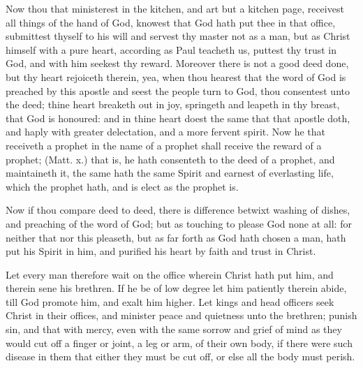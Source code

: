 Now thou that ministerest in the kitchen, and art but a 
kitchen page, receivest all things of the hand of God, 
knowest that God hath put thee in that office, submittest thyself
to his will and servest thy master not as a man, but as 
Christ himself with a pure heart, according as Paul 
teacheth us, puttest thy trust in God, and with him seekest 
thy reward. Moreover there is not a good deed done, but 
thy heart rejoiceth therein, yea, when thou hearest that the 
word of God is preached by this apostle and seest the 
people turn to God, thou consentest unto the deed; thine 
heart breaketh out in joy, springeth and leapeth in thy breast, 
that God is honoured: and in thine heart doest the same 
that that apostle doth, and haply with greater delectation, 
and a more fervent spirit. Now he that receiveth a prophet 
in the name of a prophet shall receive the reward of a 
prophet; (Matt. x.) that is, he hath consenteth to the deed 
of a prophet, and maintaineth it, the same hath the same 
Spirit and earnest of everlasting life, which the prophet 
hath, and is elect as the prophet is. 

Now if thou compare deed to deed, there is difference 
betwixt washing of dishes, and preaching of the word of 
God; but as touching to please God none at all: for 
neither that nor this pleaseth, but as far forth as God hath 
chosen a man, hath put his Spirit in him, and purified his 
heart by faith and trust in Christ. 

Let every man therefore wait on the office wherein Christ 
hath put him, and therein sene his brethren. If he be of 
low degree let him patiently therein abide, till God promote
him, and exalt him higher. Let kings and head officers 
seek Christ in their offices, and minister peace and quietness
unto the brethren; punish sin, and that with mercy, 
even with the same sorrow and grief of mind as they would 
cut off a finger or joint, a leg or arm, of their own body, 
if there were such disease in them that either they must be 
cut off, or else all the body must perish. 

